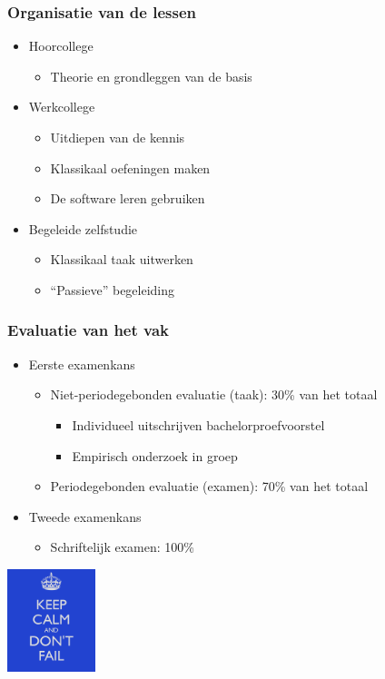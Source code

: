 \documentclass{beamer}
\begin{document}
\begin{frame}
  \frametitle{Organisatie van de lessen}

  \begin{itemize}
    \item Hoorcollege
      \begin{itemize}
        \item Theorie en grondleggen van de basis
      \end{itemize}
    \item Werkcollege
      \begin{itemize}
        \item Uitdiepen van de kennis
        \item Klassikaal oefeningen maken
        \item De software leren gebruiken
      \end{itemize}
    \item Begeleide zelfstudie
      \begin{itemize}
        \item Klassikaal taak uitwerken
        \item ``Passieve'' begeleiding
      \end{itemize}
  \end{itemize}
\end{frame}

\begin{frame}
  \frametitle{Evaluatie van het vak}

  \begin{itemize}
    \item Eerste examenkans
      \begin{itemize}
        \item Niet-periodegebonden evaluatie (taak): 30\% van het totaal
          \begin{itemize}
            \item Individueel uitschrijven bachelorproefvoorstel
            \item Empirisch onderzoek in groep
          \end{itemize}
        \item Periodegebonden evaluatie (examen): 70\% van het totaal
      \end{itemize}
    \item Tweede examenkans
      \begin{itemize}
        \item Schriftelijk examen: 100\%
      \end{itemize}
  \end{itemize}

  \begin{center}
    \includegraphics[height=3cm]{img/intro-07}
  \end{center}
\end{frame}
\end{document}
